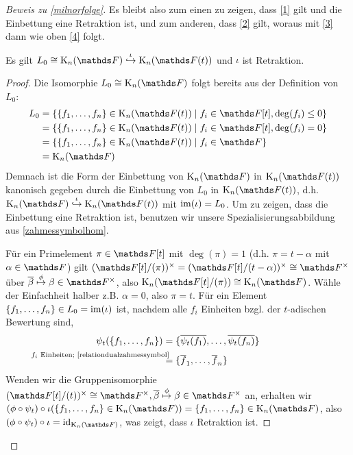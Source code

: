 \documentclass[ngerman,fontsize=11pt, paper=a4, parskip=half, titlepage=true, toc=bib]{scrartcl}
\begin{document}
\begin{proof}[Beweis zu \ref{milnorfolge}]
  Es bleibt also zum einen zu zeigen, dass \ref{1} gilt und die Einbettung eine
  Retraktion ist, und zum anderen, dass \ref{2} gilt, woraus mit \ref{3} dann wie
  oben \ref{4} folgt.
  
  \begin{Lem}
    Es gilt $L_0\cong \KnF\overset{\iota}{\hookrightarrow} \KnFt$
    und $\iota$ ist Retraktion.
    \begin{proof}
      Die Isomorphie $L_0\cong\KnF$ folgt bereits aus der Definition
      von $L_0$:
      \begin{align*}
        L_0
        &=\left\{\{f_1,\dotsc,f_n\}\in\KnFt 
          \mid f_i\in\F[t], \deg(f_i)\leq 0\right\}\\
        &=\left\{\{f_1,\dotsc,f_n\}\in\KnFt 
          \mid f_i\in\F[t], \deg(f_i)= 0\right\}\\
        &=\left\{\{f_1,\dotsc,f_n\}\in\KnFt 
          \mid f_i\in\F\right\}\\
        &=\KnF
      \end{align*}
      Demnach ist die Form der Einbettung von $\KnF$ in $\KnFt$
      kanonisch gegeben durch die Einbettung von $L_0$ in $\KnFt$, 
      d.h. $\KnF\overset{\iota}{\hookrightarrow}\KnFt$ mit $\operatorname{im}(\iota)=L_0$.
      Um zu zeigen, dass die Einbettung eine Retraktion ist,
      benutzen wir unsere Spezialisierungsabbildung aus 
      \ref{zahmessymbolhom}.
      
      Für ein Primelement $\pi\in\F[t]$ mit $\deg(\pi)=1$
      (d.h. $\pi=t-\alpha$ mit $\alpha\in\F$)
      gilt $(\Ftpi)^\times=(\F[t]/(t-\alpha))^\times\cong \Fx$ 
      über $\ov{\beta}\overset{\phi}{\mapsto} \beta\in\Fx$, 
      also $\KnFtpi\cong\KnF$.
      Wähle der Einfachheit halber z.B. $\alpha=0$, also $\pi=t$.
      Für ein Element $\{f_1,\dotsc, f_n\}\in L_0=\operatorname{im}(\iota)$ ist,
      nachdem alle $f_i$ Einheiten bzgl. der $t$-adischen Bewertung sind,
      \begin{align*}
        \psi_t(\{f_1,\dotsc,f_n\})
        &=\{\ov{\psi_t(f_1)},\dotsc, \ov{\psi_t(f_n)}\}\\
        &\overset{\mathllap{\text{$f_i$ Einheiten; 
          \ref{relationdualzahmessymbol}}}}{=}
          \{\ov f_1,\dotsc, \ov f_n\}
      \end{align*}
      Wenden wir die Gruppenisomorphie $(\F[t]/(t))^\times\cong\Fx,
      \ov\beta\overset{\phi}{\mapsto}\beta\in\Fx$ an, erhalten wir
      $(\phi\circ\psi_t)\circ \iota(\{f_1,\dotsc,f_n\}\in\KnF)
      =\{f_1,\dotsc,f_n\}\in\KnF$,
      also $(\phi\circ\psi_t)\circ \iota=\id_{\KnF}$, was zeigt, dass
      $\iota$ Retraktion ist.
    \end{proof}
  \end{Lem}
  

\end{proof}
\end{document}
